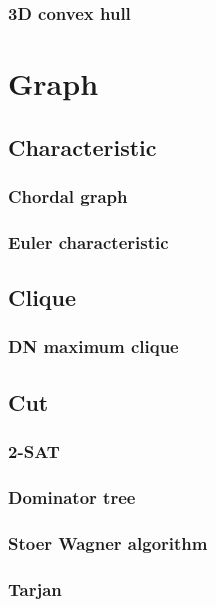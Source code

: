 \documentclass[titlepage,a4paper,10pt]{article}
\begin{document}
\begin{multicols}{2}
\begin{spacing}{0.8}
{				\subsubsection{3D convex hull}
					
		\section{Graph}
			
			\subsection{Characteristic}
				\subsubsection{Chordal graph}
					
				\subsubsection{Euler characteristic}
					
			\subsection{Clique}
				\subsubsection{DN maximum clique}
					
			\subsection{Cut}
				\subsubsection{2-SAT}
					
				\subsubsection{Dominator tree}
					
				\subsubsection{Stoer Wagner algorithm}
					
				\subsubsection{Tarjan}
					
}
\end{spacing}
\end{multicols}
\end{document}
